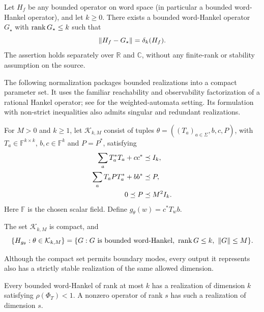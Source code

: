\begin{theorem}\label{I:U:thm:attainment}\label{I:S:thm:attainment}
Let $H_f$ be any bounded operator on word space (in particular a bounded word-Hankel operator), and let $k\ge0$. There exists a bounded word-Hankel operator $G_\star$ with $\operatorname{rank} G_\star\le k$ such that
\[
 \left\lVert H_f-G_\star\right\rVert=\delta_k(H_f).
\]
The assertion holds separately over $\mathbb R$ and $\mathbb C$, without any finite-rank or stability assumption on the source.
\end{theorem}


The following normalization packages bounded realizations into a compact parameter set. It uses the familiar reachability and observability factorization of a rational Hankel operator; see \cite{sva2019} for the weighted-automata setting. Its formulation with non-strict inequalities also admits singular and redundant realizations.

For $M>0$ and $k\ge1$, let $\mathcal K_{k,M}$ consist of tuples
$\theta=((T_a)_{a\in\Sigma},b,c,P)$, with $T_a\in\mathbb F^{k\times k}$,
$b,c\in\mathbb F^k$ and $P=P^*$, satisfying
\begin{align}
 \sum_a T_a^*T_a+cc^*&\preceq I_k,\label{I:U:eq:normal-observation}\\
 \sum_a T_aPT_a^*+bb^*&\preceq P,\label{I:U:eq:normal-reachability}\\
 0\preceq P&\preceq M^2I_k.\label{I:U:eq:normal-bound}
\end{align}
Here $\mathbb F$ is the chosen scalar field. Define $g_\theta(w)=c^*T_wb$.

\begin{lemma}\label{I:U:lem:compact}
The set $\mathcal K_{k,M}$ is compact, and
\[
 \{H_{g_\theta}:\theta\in\mathcal K_{k,M}\}
 =\{G:G\text{ is bounded word-Hankel},\ \operatorname{rank} G\le k,\ \left\lVert G\right\rVert\le M\}.
\]
\end{lemma}


Although the compact set permits boundary modes, every output it represents also has a strictly stable realization of the same allowed dimension.

\begin{lemma}\label{I:U:lem:stable}
Every bounded word-Hankel of rank at most $k$ has a realization of dimension $k$ satisfying $\rho(\Phi_T)<1$. A nonzero operator of rank $s$ has such a realization of dimension $s$.
\end{lemma}



